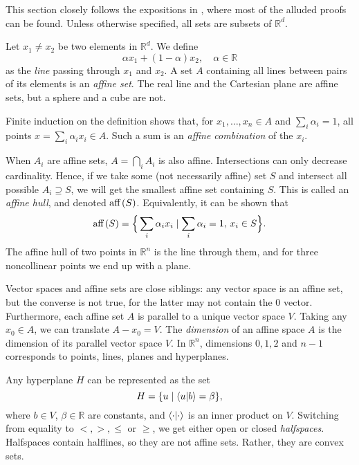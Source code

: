 		This section closely follows the expositions in \cite{rockafellar_convexanalysis_1970,grunbaum_convexpolytopes_2003,ziegler_lecturespolytopes_1995,boyd_convexoptimization_2004}, where most of the alluded proofs can be found. Unless otherwise specified, all sets are subsets of $\mathbb{R}^d$.

		Let $x_1 \neq x_2$ be two elements in $\mathbb{R}^d$. We define
		$$
			\alpha x_1 + (1 - \alpha) x_2, \quad\alpha \in \mathbb{R}
		$$
		as the \emph{line} passing through $x_1$ and $x_2$. A set $A$ containing all lines between pairs of its elements is an \emph{affine set}. The real line and the Cartesian plane are affine sets, but a sphere and a cube are not.

		Finite induction on the definition shows that, for $x_1, \ldots, x_n \in A$ and $\sum_i \alpha_i = 1$, all points $x = \sum_i \alpha_i x_i \in A$.  Such a sum is an \emph{affine combination} of the $x_i$.

		When $A_i$ are affine sets, $A = \bigcap_i A_i$ is also affine. Intersections can only decrease cardinality. Hence, if we take some (not necessarily affine) set $S$ and intersect all possible $A_i \supseteq S$, we will get the smallest affine set containing $S$. This is called an \emph{affine hull}, and denoted $\text{aff} \left( S \right)$. Equivalently, it can be shown that
		$$
			\text{aff} \left( S \right) = \Big\{ \sum_i \alpha_i x_i \mid \sum_i \alpha_i = 1, \, x_i \in S \Big\} .
		$$
		The affine hull of two points in $\mathbb{R}^n$ is the line through them, and for three noncollinear points we end up with a plane.

		Vector spaces and affine sets are close siblings: any vector space is an affine set, but the converse is not true, for the latter may not contain the $0$ vector. Furthermore, each affine set $A$ is parallel to a unique vector space $V$. Taking any $x_0 \in A$, we can translate $A - x_0 = V$. The \emph{dimension} of an affine space $A$ is the dimension of its parallel vector space $V$. In $\mathbb{R}^n$, dimensions $0, 1, 2$ and $n-1$ corresponds to points, lines, planes and hyperplanes.

		Any hyperplane $H$ can be represented as the set
		$$
			H = \{ u \mid \braket{u}{b} = \beta \} ,
		$$
		where $b \in V$, $\beta \in \mathbb{R}$ are constants, and $\braket{\cdot}{\cdot}$ is an inner product on $V$. Switching from equality to $<, >, \leq$ or $\geq$, we get either open or closed \emph{halfspaces}. Halfspaces contain halflines, so they are not affine sets. Rather, they are convex sets.

